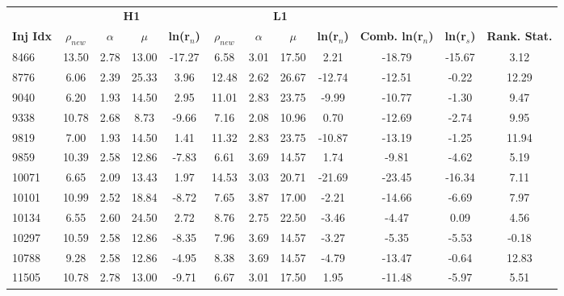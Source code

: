\begin{table}[ht]
    \centering
    \small
    \setlength{\tabcolsep}{5pt}
    \begin{adjustbox}{minipage=\linewidth-0cm, margin=-3.5cm 0pt 0pt 0cm}
    \begin{tabular}{lccccccccccc}
        \toprule
        & \multicolumn{4}{c}{\textbf{H1}} & \multicolumn{4}{c}{\textbf{L1}} \\
        \cmidrule(lr){2-5} \cmidrule(lr){6-9}
        \textbf{Inj Idx} & \textbf{$\rho_{new}$} & \textbf{$\alpha$} & \textbf{$\mu$} & \textbf{ln(r$_n$)} & \textbf{$\rho_{new}$} & \textbf{$\alpha$} & \textbf{$\mu$} & \textbf{ln(r$_n$)} & \textbf{Comb. ln(r$_n$)} & \textbf{ln(r$_s$)} & \textbf{Rank. Stat.} \\
        \midrule
        8466 & 13.50 & 2.78 & 13.00 & -17.27 & 6.58 & 3.01 & 17.50 & 2.21 & -18.79 & -15.67 & 3.12 \\
        8776 & 6.06 & 2.39 & 25.33 & 3.96 & 12.48 & 2.62 & 26.67 & -12.74 & -12.51 & -0.22 & 12.29 \\
        9040 & 6.20 & 1.93 & 14.50 & 2.95 & 11.01 & 2.83 & 23.75 & -9.99 & -10.77 & -1.30 & 9.47 \\
        9338 & 10.78 & 2.68 & 8.73 & -9.66 & 7.16 & 2.08 & 10.96 & 0.70 & -12.69 & -2.74 & 9.95 \\
        9819 & 7.00 & 1.93 & 14.50 & 1.41 & 11.32 & 2.83 & 23.75 & -10.87 & -13.19 & -1.25 & 11.94 \\
        9859 & 10.39 & 2.58 & 12.86 & -7.83 & 6.61 & 3.69 & 14.57 & 1.74 & -9.81 & -4.62 & 5.19 \\
        10071 & 6.65 & 2.09 & 13.43 & 1.97 & 14.53 & 3.03 & 20.71 & -21.69 & -23.45 & -16.34 & 7.11 \\
        10101 & 10.99 & 2.52 & 18.84 & -8.72 & 7.65 & 3.87 & 17.00 & -2.21 & -14.66 & -6.69 & 7.97 \\
        10134 & 6.55 & 2.60 & 24.50 & 2.72 & 8.76 & 2.75 & 22.50 & -3.46 & -4.47 & 0.09 & 4.56 \\
        10297 & 10.59 & 2.58 & 12.86 & -8.35 & 7.96 & 3.69 & 14.57 & -3.27 & -5.35 & -5.53 & -0.18 \\
        10788 & 9.28 & 2.58 & 12.86 & -4.95 & 8.38 & 3.69 & 14.57 & -4.79 & -13.47 & -0.64 & 12.83 \\
        11505 & 10.78 & 2.78 & 13.00 & -9.71 & 6.67 & 3.01 & 17.50 & 1.95 & -11.48 & -5.97 & 5.51 \\
        \bottomrule
    \end{tabular}
    \end{adjustbox}
    \caption{}
    \label{tab:pycbclive-top-right-diff-temp-fits}
\end{table}
